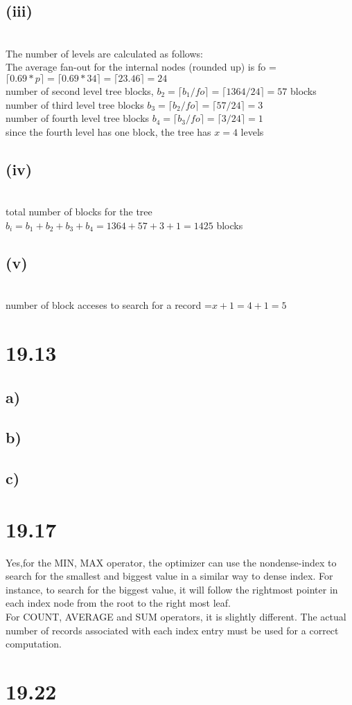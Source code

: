 \documentclass[11pt]{article}
\theoremstyle{plain}
\theoremstyle{definition}
\begin{document}
\subsection*{(iii)}\\ 
The number of levels are calculated as follows:\\
The average fan-out for the internal nodes (rounded up) is fo = $\lceil 0.69*p \rceil = \lceil 0.69*34 \rceil = \lceil 23.46 \rceil = 24$\\
number of second level tree blocks, $b_2 = \lceil b_1/fo \rceil = \lceil 1364/24 \rceil = 57$ blocks \\
number of third level tree blocks $b_3 = \lceil b_2/fo \rceil = \lceil 57/24 \rceil =3$\\
number of fourth level tree blocks $b_4 = \lceil b_3 / fo \rceil = \lceil 3/24 \rceil = 1$\\
since the fourth level has one block, the tree has $x = 4 $ levels
\subsection*{(iv)}\\
total number of blocks for the tree $b_i = b_1+b_2+b_3+b_4 = 1364+57+3+1 = 1425$ blocks\\
\subsection*{(v)}\\
number of block acceses to search for a record =$ x+1 = 4+1 = 5$

\section*{19.13} 
\subsection*{a)}
\subsection*{b)}
\subsection*{c)}


\section*{19.17}
Yes,for the MIN, MAX operator, the optimizer can use the nondense-index to search for the smallest and biggest value in a similar way to dense index. For instance, to search for the biggest value, it will follow the rightmost pointer in each index node from the root to the right most leaf. \\
For COUNT, AVERAGE and SUM operators, it is slightly different. The actual number of 
records associated with each index entry must be used for a correct computation. \\
\section*{19.22}
\end{document}
